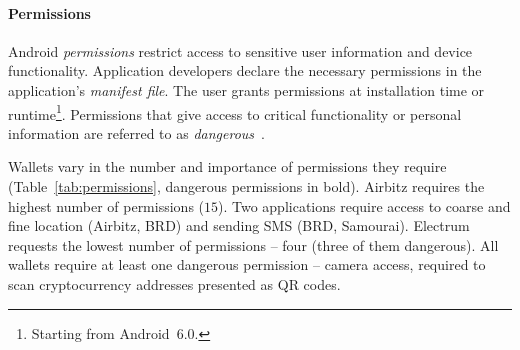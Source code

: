 \paragraph{Permissions}
Android \textit{permissions} restrict access to sensitive user information and device functionality.
Application developers declare the necessary permissions in the application's \textit{manifest file}.
The user grants permissions at installation time or runtime\footnote{Starting from Android~6.0.}.
Permissions that give access to critical functionality or personal information are referred to as \textit{dangerous}~\cite{Android}.

Wallets vary in the number and importance of permissions they require (Table~\ref{tab:permissions}, dangerous permissions in bold).
Airbitz requires the highest number of permissions ($15$).
Two applications require access to coarse and fine location (Airbitz, BRD) and sending SMS (BRD, Samourai).
Electrum requests the lowest number of permissions -- four (three of them dangerous).
All wallets require at least one dangerous permission -- camera access, required to scan cryptocurrency addresses presented as QR codes.


